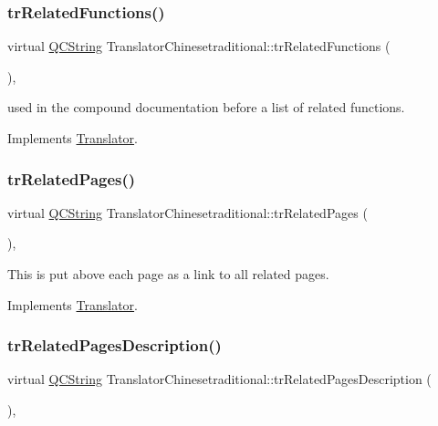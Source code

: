 \subsubsection{\texorpdfstring{trRelatedFunctions()}{trRelatedFunctions()}}
{\footnotesize\ttfamily virtual \mbox{\hyperlink{class_q_c_string}{Q\+C\+String}} Translator\+Chinesetraditional\+::tr\+Related\+Functions (\begin{DoxyParamCaption}{ }\end{DoxyParamCaption})\hspace{0.3cm}{\ttfamily [inline]}, {\ttfamily [virtual]}}

used in the compound documentation before a list of related functions. 

Implements \mbox{\hyperlink{class_translator}{Translator}}.

\mbox{\label{class_translator_chinesetraditional_a56b731c25ed22e469f9208ab8bef48ca}} 
\subsubsection{\texorpdfstring{trRelatedPages()}{trRelatedPages()}}
{\footnotesize\ttfamily virtual \mbox{\hyperlink{class_q_c_string}{Q\+C\+String}} Translator\+Chinesetraditional\+::tr\+Related\+Pages (\begin{DoxyParamCaption}{ }\end{DoxyParamCaption})\hspace{0.3cm}{\ttfamily [inline]}, {\ttfamily [virtual]}}

This is put above each page as a link to all related pages. 

Implements \mbox{\hyperlink{class_translator}{Translator}}.

\mbox{\label{class_translator_chinesetraditional_ab2e776ba63d174c19e000c6e50dc585e}} 
\subsubsection{\texorpdfstring{trRelatedPagesDescription()}{trRelatedPagesDescription()}}
{\footnotesize\ttfamily virtual \mbox{\hyperlink{class_q_c_string}{Q\+C\+String}} Translator\+Chinesetraditional\+::tr\+Related\+Pages\+Description (\begin{DoxyParamCaption}{ }\end{DoxyParamCaption})\hspace{0.3cm}{\ttfamily [inline]}, {\ttfamily [virtual]}}

